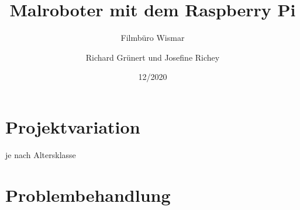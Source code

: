 \documentclass[12pt]{article}
\title{Malroboter mit dem Raspberry Pi}
\subtitle{Filmbüro Wismar}
\author{Richard Grünert und Josefine Richey}
\date{12/2020}
\begin{document}
\maketitle

\tableofcontents

\pagebreak





\section{Projektvariation}
je nach Altersklasse

\section{Problembehandlung}




\end{document}
